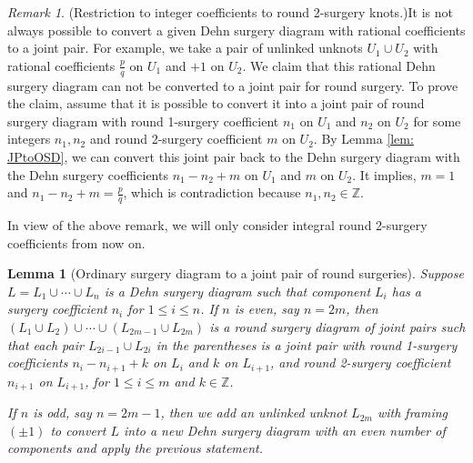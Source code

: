 \documentclass{amsart}
\theoremstyle{plain}
\newtheorem{lem}{Lemma}
\theoremstyle{remark}
\newtheorem{rem}{Remark}
\theoremstyle{definition}
\begin{document}
\begin{rem}{(Restriction to integer coefficients to round 2-surgery knots.)}It is not always possible to convert a given Dehn surgery diagram with rational coefficients to a joint pair. 
    For example, we take a pair of unlinked unknots $U_1 \cup U_2$ with rational coefficients $\frac{p}{q}$ on $U_1$ and $+1$ on $U_2$. We claim that this rational Dehn surgery diagram can not be converted to a joint pair for round surgery. To prove the claim, assume that it is possible to convert it into a joint pair of round surgery diagram with round 1-surgery coefficient $n_1$ on $U_1$ and $n_2$ on $U_2$ for some integers $n_1,n_2$ and round 2-surgery coefficient $m$ on $U_2$. By Lemma \ref{lem: JPtoOSD}, we can convert this joint pair back to the Dehn surgery diagram with the Dehn surgery coefficients $n_1 -n_2 +m$ on $U_1$ and $m$ on $U_2$. 
    It implies, $m=1$ and $n_1 -n_2 +m = \frac{p}{q}$, which is contradiction because $n_1, n_2 \in \mathbb{Z}$.
\end{rem}

In view of the above remark, we will only consider integral round 2-surgery coefficients from now on.  
 
\begin{lem}[{Ordinary surgery diagram to a joint pair of round surgeries}]\label{lem: OSDtoJPRS}
Suppose $L=L_1 \cup \cdots \cup L_n$ is a Dehn surgery diagram such that component $L_i$ has a surgery coefficient $n_i$ for $1 \leq i\leq n$. 
If $n$ is even, say $n =2m$, then $(L_1 \cup L_2)\cup  \cdots \cup (L_{2m-1} \cup L_{2m})$ is a round surgery diagram of joint pairs such that each pair $L_{2i-1} \cup L_{2i}$ in the parentheses is a joint pair with round 1-surgery coefficients $n_i -n_{i+1}+k $ on $L_{i}$ and $k$ on $L_{i+1}$, and round 2-surgery coefficient $n_{i+1}$ on $L_{i+1}$, for $1 \leq i \leq m$ and $k\in \mathbb{Z}$. 

If $n$ is odd, say $n=2m-1$, then we add an unlinked unknot $L_{2m}$ with framing $(\pm1)$ to convert $L$ into a new Dehn surgery diagram with an even number of components and apply the previous statement.
\end{lem}
\end{document}
